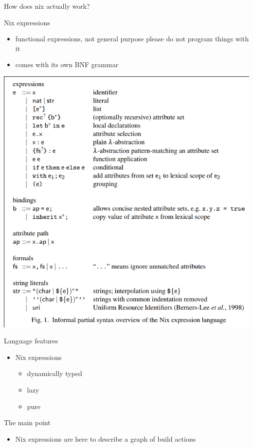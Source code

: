 \documentclass[presentation]{beamer}
\begin{document}
\begin{frame}[label={sec:org6d29320},fragile]{How does nix actually work?}
 \begin{block}{Nix expressions}
\begin{itemize}
\item functional expressions, not general purpose please do not program
things with it
\item comes with its own BNF grammar
\end{itemize}
\begin{center}
\includegraphics[width=.9\linewidth]{./images/screenshot-05.png}
\end{center}
\end{block}
\begin{block}{Language features}
\begin{itemize}
\item Nix expressions
\begin{itemize}
\item dynamically typed
\item lazy
\item pure
\end{itemize}
\end{itemize}
\end{block}
\begin{block}{The main point}
\begin{itemize}
\item Nix expressions are here to describe a graph of build actions

\end{itemize}
\end{block}
\end{frame}
\end{document}
